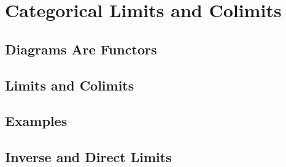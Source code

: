 \chapter{Categorical Limits and Colimits}

\section{Diagrams Are Functors}



\section{Limits and Colimits}



\section{Examples}




\section{Inverse and Direct Limits}



